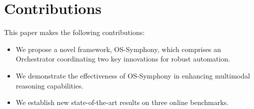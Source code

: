 \documentclass{article}
\begin{document}
\section{Contributions}
This paper makes the following contributions:
\begin{itemize}
\item We propose a novel framework, OS-Symphony, which comprises an Orchestrator coordinating two key innovations for robust automation.
\item We demonstrate the effectiveness of OS-Symphony in enhancing multimodal reasoning capabilities.
\item We establish new state-of-the-art results on three online benchmarks.
\end{itemize}
\end{document}
